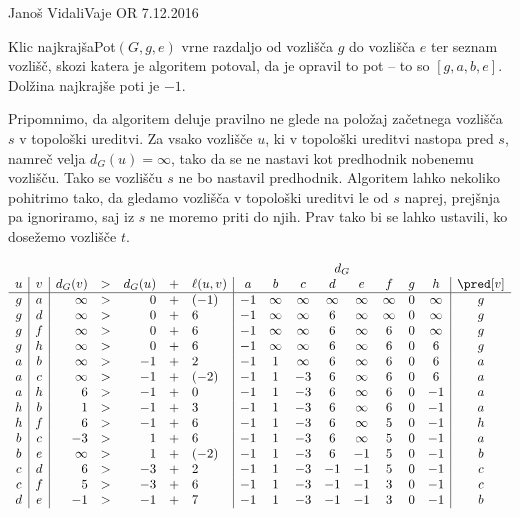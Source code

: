 \begin{naloga}{Janoš Vidali}{Vaje OR 7.12.2016}
\begin{odgovor}
\begin{enumerate}[(a)]
Klic {\sc najkrajšaPot}$(G, g, e)$
vrne razdaljo od vozlišča $g$ do vozlišča $e$
ter seznam vozlišč, skozi katera je algoritem potoval,
da je opravil to pot -- to so $[g, a, b, e]$.
Dolžina najkrajše poti je $-1$.

Pripomnimo, da algoritem deluje pravilno
ne glede na položaj začetnega vozlišča $s$ v topološki ureditvi.
Za vsako vozlišče $u$, ki v topološki ureditvi nastopa pred $s$,
namreč velja $d_G(u) = \infty$,
tako da se ne nastavi kot predhodnik nobenemu vozlišču.
Tako se vozlišču $s$ ne bo nastavil predhodnik.
Algoritem lahko nekoliko pohitrimo tako,
da gledamo vozlišča v topološki ureditvi le od $s$ naprej,
prejšnja pa ignoriramo, saj iz $s$ ne moremo priti do njih.
Prav tako bi se lahko ustavili, ko dosežemo vozlišče $t$.

\begin{tabela}
$$
\begin{array}{c|c|rcrcl|cccccccc|c}
\multicolumn{7}{c}{} & \multicolumn{8}{c}{d_G} \\
u & v & d_G(v) &>& d_G(u) &+& \ell(u, v) & a & b & c & d & e & f & g & h & \pred[v] \\ \hline
g & a & \infty &>& 0 &+& (-1) & -1 & \infty & \infty & \infty & \infty & \infty & 0 & \infty & g\\
g & d & \infty &>& 0 &+& 6 & -1 & \infty & \infty & 6 & \infty & \infty & 0 & \infty & g\\
g & f & \infty &>& 0 &+& 6 & -1 & \infty & \infty & 6 & \infty & 6 & 0 & \infty & g\\
g & h & \infty &>& 0 &+& 6 & -1 & \infty & \infty & 6 & \infty & 6 & 0 & 6 & g\\
a & b & \infty &>& -1 &+& 2 & -1 & 1 & \infty & 6 & \infty & 6 & 0 & 6 & a\\
a & c & \infty &>& -1 &+& (-2) & -1 & 1 & -3 & 6 & \infty & 6 & 0 & 6 & a\\
a & h & 6 &>& -1 &+& 0 & -1 & 1 & -3 & 6 & \infty & 6 & 0 & -1 & a\\
h & b & 1 &>& -1 &+& 3 & -1 & 1 & -3 & 6 & \infty & 6 & 0 & -1 & a\\
h & f & 6 &>& -1 &+& 6 & -1 & 1 & -3 & 6 & \infty & 5 & 0 & -1 & h\\
b & c & -3 &>& 1 &+& 6 & -1 & 1 & -3 & 6 & \infty & 5 & 0 & -1 & a\\
b & e & \infty &>& 1 &+& (-2) & -1 & 1 & -3 & 6 & -1 & 5 & 0 & -1 & b\\
c & d & 6 &>& -3 &+& 2 & -1 & 1 & -3 & -1 & -1 & 5 & 0 & -1 & c\\
c & f & 5 &>& -3 &+& 6 & -1 & 1 & -3 & -1 & -1 & 3 & 0 & -1 & c\\
d & e & -1 &>& -1 &+& 7 & -1 & 1 & -3 & -1 & -1 & 3 & 0 & -1 & b
\end{array}
$$
\end{tabela}


\end{enumerate}
\end{odgovor}
\end{naloga}
